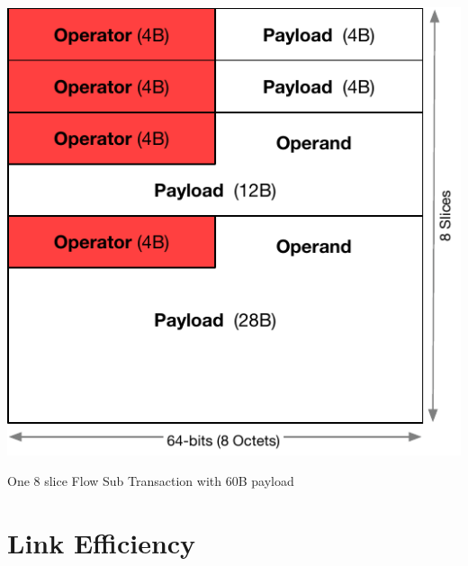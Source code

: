 \documentclass[../HFT-main.tex]{subfiles}
\begin{document}

\begin{marginfigure}
        \includegraphics[width=\linewidth]{../figures/Mixed-1-2-4-slice-flowtransactions.pdf}
  \caption{One 8 slice Flow Sub Transaction with 60B payload}
    \vspace{8pt}
\end{marginfigure}

\section{Link Efficiency}
\end{document}
